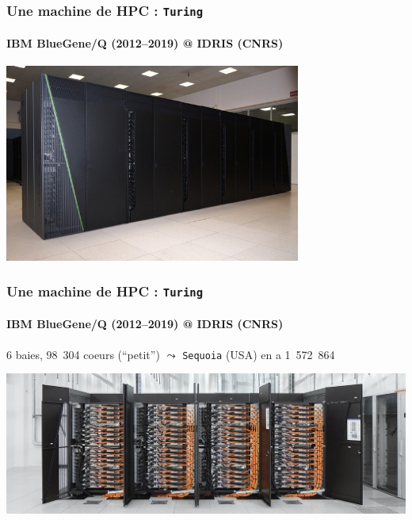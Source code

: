 \documentclass[xcolor={x11names,svgnames}]{beamer}
\begin{document}


\begin{frame}
  \frametitle{Une machine de HPC : \texttt{Turing}}
  \framesubtitle{IBM BlueGene/Q (2012--2019) @ IDRIS (CNRS)}
  
  \begin{center}
    \includegraphics[height=6.5cm]{turing}
  \end{center}
\end{frame}


\begin{frame}
  \frametitle{Une machine de HPC : \texttt{Turing}}
  \framesubtitle{IBM BlueGene/Q (2012--2019) @ IDRIS (CNRS)}

  6 baies, 98~304 coeurs (``petit'') $\leadsto$ \texttt{Sequoia} (USA) en a 1~572~864
  
  \begin{center}
    \includegraphics[width=\textwidth]{bgq}
  \end{center}
\end{frame}
\end{document}
